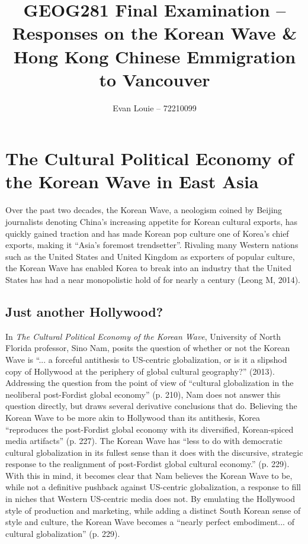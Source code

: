 \documentclass[man,donotrepeattitle,letter]{apa6}
\title{GEOG281 Final Examination -- Responses on the Korean Wave \& Hong Kong Chinese Emmigration to Vancouver}
\author{Evan Louie -- 72210099}
\affiliation{University of British Columbia}
\begin{document}
\maketitle

\tableofcontents
\newpage

\section{The Cultural Political Economy of the Korean Wave in East Asia}
Over the past two decades, the Korean Wave, a neologism coined by Beijing journalists denoting China's increasing appetite for Korean cultural exports, has quickly gained traction and has made Korean pop culture one of Korea's chief exports, making it ``Asia's foremost trendsetter''.  Rivaling many Western nations such as the United States and United Kingdom as exporters of popular culture, the Korean Wave has enabled Korea to break into an industry that the United States has had a near monopolistic hold of for nearly a century (Leong M, 2014).

\subsection{Just another Hollywood?}
In \textit{The Cultural Political Economy of the Korean Wave}, University of North Florida professor, Sino Nam, posits the question of whether or not the Korean Wave is ``... a forceful antithesis to US-centric globalization, or is it a slipshod copy of Hollywood at the periphery of global cultural geography?'' (2013). Addressing the question from the point of view of ``cultural globalization in the neoliberal post-Fordist global economy'' (p. 210), Nam does not answer this question directly, but draws several derivative conclusions that do.  Believing the Korean Wave to be more akin to Hollywood than its antithesis, Korea ``reproduces the post-Fordist global economy with its diversified, Korean-spiced media artifacts'' (p. 227). The Korean Wave has ``less to do with democratic cultural globalization in its fullest sense than it does with the discursive, strategic response to the realignment of post-Fordist global cultural economy.'' (p. 229). With this in mind, it becomes clear that Nam believes the Korean Wave to be, while not a definitive pushback against US-centric globalization, a response to fill in niches that Western US-centric media does not.  By emulating the Hollywood style of production and marketing, while adding a distinct South Korean sense of style and culture, the Korean Wave becomes a ``nearly perfect embodiment... of cultural globalization'' (p. 229).
\end{document}
